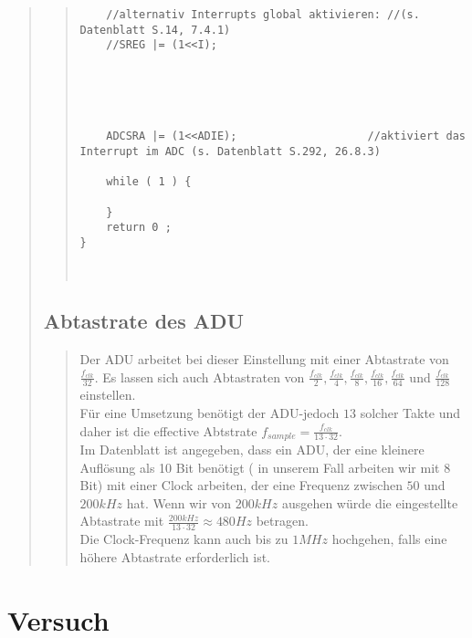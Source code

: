 \begin{quote}
\begin{quote}
\begin{lstlisting}
    //alternativ Interrupts global aktivieren: //(s. Datenblatt S.14, 7.4.1)
    //SREG |= (1<<I);                           
                                            
    



    ADCSRA |= (1<<ADIE);                    //aktiviert das Interrupt im ADC (s. Datenblatt S.292, 26.8.3)

    while ( 1 ) {

    }
    return 0 ;
}



\end{lstlisting}         
    \end{quote}

    \subsection{Abtastrate des ADU}
    \begin{quote}
        Der ADU arbeitet bei dieser Einstellung mit einer Abtastrate von $\frac{f_{clk}}{32}$. Es lassen sich auch
        Abtastraten von $\frac{f_{clk}}{2}, \frac{f_{clk}}{4}, \frac{f_{clk}}{8}, \frac{f_{clk}}{16},
        \frac{f_{clk}}{64}$ und $\frac{f_{clk}}{128}$ einstellen.\\
        Für eine Umsetzung benötigt der ADU-jedoch $13$ solcher Takte und daher ist die effective Abtstrate $f_{sample}
        = \frac{f_{clk}}{13 \cdot   32}$.\\
        Im Datenblatt ist angegeben, dass ein ADU, der eine kleinere Auflösung
        als 10 Bit benötigt ( in unserem Fall arbeiten wir mit 8 Bit) mit einer
        Clock arbeiten, der eine Frequenz zwischen $50$ und $200 kHz$ hat. Wenn
        wir von $200 kHz$ ausgehen würde die eingestellte Abtastrate mit
        $\frac{200 kHz}{13 \cdot 32} \approx 480 Hz$ betragen.\\
        
        Die Clock-Frequenz kann auch bis zu $1 MHz$ hochgehen, falls eine höhere
        Abtastrate erforderlich ist.
        
        
    \end{quote}

\end{quote}


\section{Versuch}
\begin{quote}
	
\end{quote}

